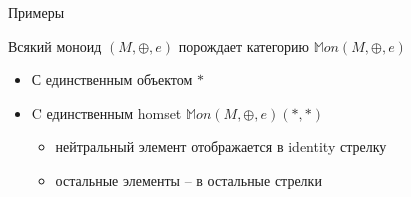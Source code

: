 \documentclass[
  russian,
  aspectratio=169,
  xcolor={svgnames},
  hyperref={colorlinks,citecolor=DeepPink4,linkcolor=DarkRed,urlcolor=DarkBlue}]{beamer}
\begin{document}
\begin{frame}[fragile]{Примеры}
\begin{minipage}{0.65\textwidth}
Всякий моноид $(M,\oplus,e)$ порождает категорию 
$\mathbb{M}on(M,\oplus,e)$

\begin{itemize}
 \item С единственным объектом $*$
 \item C единственным homset $\mathbb{M}on(M,\oplus,e)(*,*)$ 
    \begin{itemize}
    \item нейтральный элемент отображается в identity стрелку
    \item остальные элементы -- в остальные стрелки
    \end{itemize}
\end{itemize}
\vspace{1cm}
\end{minipage}
\begin{minipage}{0.3\textwidth}
 
\end{minipage}



\end{frame}
\end{document}
